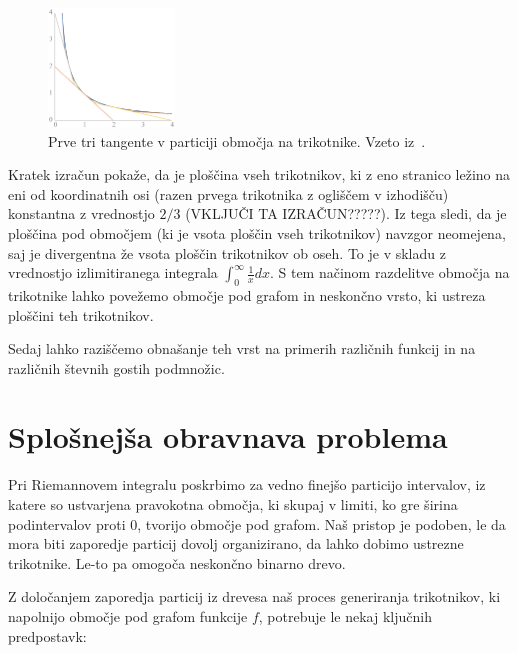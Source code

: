 \documentclass[a4paper, 12pt, titlepage]{article}
\begin{document}
\begin{figure}[h]
    \centering
    \includegraphics[width=0.3\textwidth]{slike/uvodni_primer_prvi_trikotniki.png}
    \caption{Prve tri tangente v particiji območja na trikotnike. Vzeto iz~\cite{osnovni_clanek}.}
    \label{uvodni_primer_prvi_trikotniki}
\end{figure}

Kratek izračun pokaže, da je ploščina vseh trikotnikov, ki z eno stranico ležino na eni od koordinatnih osi (razen prvega trikotnika z ogliščem v izhodišču) konstantna z vrednostjo $ 2/3 $ (VKLJUČI TA IZRAČUN?????). Iz tega sledi, da je ploščina pod območjem (ki je vsota ploščin vseh trikotnikov) navzgor neomejena, saj je divergentna že vsota ploščin trikotnikov ob oseh. To je v skladu z vrednostjo izlimitiranega integrala $ \int_{0}^{\infty}\frac{1}{x}dx $. S tem načinom razdelitve območja na trikotnike lahko povežemo območje pod grafom in neskončno vrsto, ki ustreza ploščini teh trikotnikov.

Sedaj lahko raziščemo obnašanje teh vrst na primerih različnih funkcij in na različnih števnih gostih podmnožic.




\section{Splošnejša obravnava problema}

Pri Riemannovem integralu poskrbimo za vedno finejšo particijo intervalov, iz katere so ustvarjena pravokotna območja, ki skupaj v limiti, ko gre širina podintervalov proti 0, tvorijo območje pod grafom. Naš pristop je podoben, le da mora biti zaporedje particij dovolj organizirano, da lahko dobimo ustrezne trikotnike. Le-to pa omogoča neskončno binarno drevo.

Z določanjem zaporedja particij iz drevesa naš proces generiranja trikotnikov, ki napolnijo območje pod grafom funkcije $ f $, potrebuje le nekaj ključnih predpostavk:
\end{document}
